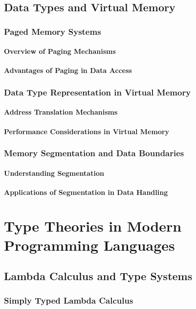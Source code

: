 \documentclass[12pt, oneside]{book}
\begin{document}
\section{Data Types and Virtual Memory}
\subsection{Paged Memory Systems}
\subsubsection{Overview of Paging Mechanisms}
\subsubsection{Advantages of Paging in Data Access}
\subsection{Data Type Representation in Virtual Memory}
\subsubsection{Address Translation Mechanisms}
\subsubsection{Performance Considerations in Virtual Memory}
\subsection{Memory Segmentation and Data Boundaries}
\subsubsection{Understanding Segmentation}
\subsubsection{Applications of Segmentation in Data Handling}

\chapter{Type Theories in Modern Programming Languages}
\section{Lambda Calculus and Type Systems}
\subsection{Simply Typed Lambda Calculus}
\end{document}
